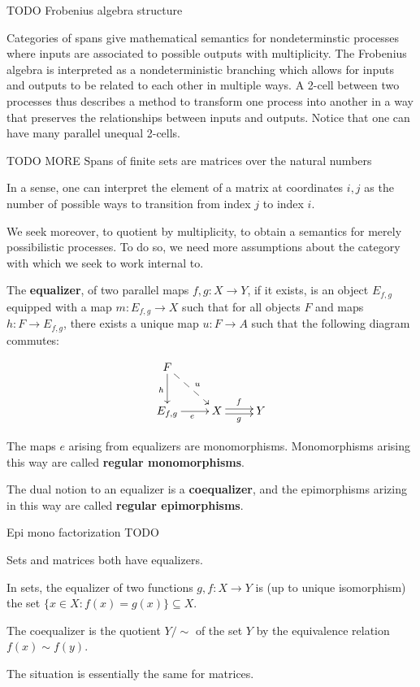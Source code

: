 TODO  Frobenius algebra structure


Categories of spans give mathematical semantics for nondeterminstic processes where inputs are associated to possible outputs with multiplicity.  The Frobenius algebra is interpreted as a nondeterministic branching which allows for inputs and outputs to be related to each other in multiple ways.
A 2-cell between two processes thus describes a method to transform one process into another in a way that preserves the relationships between inputs and outputs.
Notice that one can have many parallel unequal 2-cells.


\begin{lemma}
TODO MORE Spans of finite sets are matrices over the natural numbers
\end{lemma}

In a sense, one can interpret the element of a matrix at coordinates $i,j$ as the number of possible ways to transition from index $j$ to index $i$.


  We seek moreover, to quotient by multiplicity, to obtain a semantics for merely possibilistic processes.  To do so, we need more assumptions about the category with which we seek to work internal to.


\begin{definition}
The {\bf equalizer}, of two parallel maps $f,g:X\to Y$, if it exists, is an object $E_{f,g}$ equipped with a map $m:E_{f,g}\to X$ such that for all objects $F$ and maps $h:F\to E_{f,g}$, there exists a unique map $u:F\to A$ such that the following diagram commutes:

$$
\xymatrix{
    F \ar@{-->}[dr]^{u} \ar[d]_h
  \\ E_{f,g} \ar[r]_e
    & X \ar@<-.5ex>[r]_g \ar@<.5ex>[r]^f
    & Y
}
$$

The maps $e$ arising from equalizers are monomorphisms.  Monomorphisms arising this way are called {\bf regular monomorphisms}.


The dual notion to an equalizer is a {\bf coequalizer}, and the epimorphisms arizing in this way are called {\bf regular epimorphisms}.
\end{definition}



\begin{lemma}
Epi mono factorization TODO
\end{lemma}


\begin{example}
Sets and matrices both have equalizers.

In sets, the equalizer of two functions $g,f:X\to Y$ is (up to unique isomorphism) the set $\{x \in X:f(x)=g(x)\} \subseteq X$.

The coequalizer is the quotient $Y/\sim$   of the set $Y$ by the equivalence relation $f(x)\sim f(y)$.

The situation is essentially the same for matrices.
\end{example}


